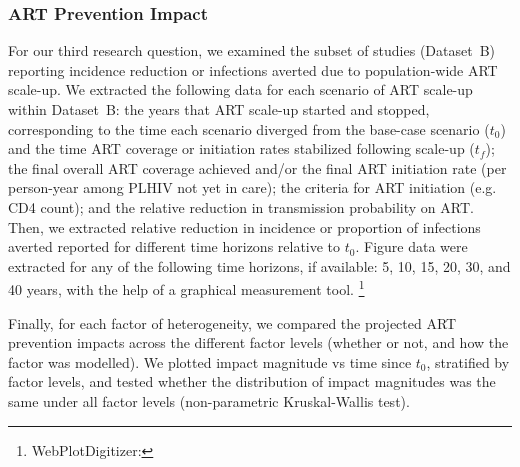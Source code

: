 \subsubsection{ART Prevention Impact}
\label{sss:meth:api}
For our third research question, we examined the subset of studies (Dataset~B)
reporting incidence reduction or infections averted due to
population-wide ART scale-up.
We extracted the following data for each scenario of ART scale-up within Dataset~B:
the years that ART scale-up started and stopped, corresponding to
the time each scenario diverged from the base-case scenario ($t_0$) and
the time ART coverage or initiation rates stabilized following scale-up ($t_f$);
the final overall ART coverage achieved and/or
the final ART initiation rate (per person-year among PLHIV not yet in care);
the criteria for ART initiation (e.g. CD4 count);
and the relative reduction in transmission probability on ART.
Then, we extracted relative reduction in incidence or proportion of infections averted
reported for different time horizons relative to $t_0$.
Figure data were extracted for any of the following time horizons, if available:
5, 10, 15, 20, 30, and 40 years,
with the help of a graphical measurement tool.%
\footnote{WebPlotDigitizer: }
\par
Finally, for each factor of heterogeneity,
we compared the projected ART prevention impacts across
the different factor levels (whether or not, and how the factor was modelled).
We plotted impact magnitude vs time since $t_0$, stratified by factor levels,
and tested whether the distribution of impact magnitudes
was the same under all factor levels (non-parametric Kruskal-Wallis test).